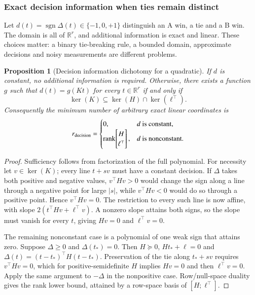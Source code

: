 \documentclass[11pt]{article}
\newtheorem{proposition}{Proposition}
\begin{document}
\subsubsection{Exact decision information when ties remain distinct}
Let $d(t)=\operatorname{sgn}\Delta(t)\in\{-1,0,+1\}$ distinguish an A win, a tie and a B win. The domain is all of $\mathbb R^r$, and additional information is exact and linear. These choices matter: a binary tie-breaking rule, a bounded domain, approximate decisions and noisy measurements are different problems.

\begin{proposition}[Decision information dichotomy for a quadratic]
\label{prop:decisioninformation}
If $d$ is constant, no additional information is required. Otherwise, there exists a function $g$ such that $d(t)=g(Kt)$ for every $t\in\mathbb R^r$ if and only if
\[
\ker(K)\subseteq\ker(H)\cap\ker(\ell^\top).
\]
Consequently the minimum number of arbitrary exact linear coordinates is
\[
r_{\rm decision}=\begin{cases}
0,&d\ \text{is constant},\\
\operatorname{rank}\!\begin{bmatrix}H\\\ell^\top\end{bmatrix},&d\ \text{is nonconstant}.
\end{cases}
\]
\end{proposition}
\begin{proof}
Sufficiency follows from factorization of the full polynomial. For necessity let $v\in\ker(K)$; every line $t+sv$ must have a constant decision. If $\Delta$ takes both positive and negative values, $v^\top Hv>0$ would change the sign along a line through a negative point for large $|s|$, while $v^\top Hv<0$ would do so through a positive point. Hence $v^\top Hv=0$. The restriction to every such line is now affine, with slope $2(t^\top Hv+\ell^\top v)$. A nonzero slope attains both signs, so the slope must vanish for every $t$, giving $Hv=0$ and $\ell^\top v=0$.

The remaining nonconstant case is a polynomial of one weak sign that attains zero. Suppose $\Delta\ge0$ and $\Delta(t_*)=0$. Then $H\succeq0$, $Ht_*+\ell=0$ and $\Delta(t)=(t-t_*)^\top H(t-t_*)$. Preservation of the tie along $t_*+sv$ requires $v^\top Hv=0$, which for positive-semidefinite $H$ implies $Hv=0$ and then $\ell^\top v=0$. Apply the same argument to $-\Delta$ in the nonpositive case. Row/null-space duality gives the rank lower bound, attained by a row-space basis of $[H;\ell^\top]$.
\end{proof}
\end{document}
